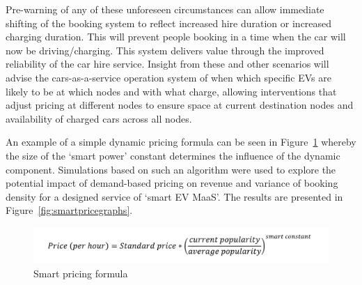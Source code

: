 \documentclass[b5paper,10pt]{article}
\begin{document}
Pre-warning of any of these unforeseen circumstances can allow
immediate shifting of the booking system to reflect increased hire
duration or increased charging duration. This will prevent people
booking in a time when the car will now be driving/charging. This
system delivers value through the improved reliability of the car hire
service. Insight from these and other scenarios will advise the
cars-as-a-service operation system of when which specific EVs are
likely to be at which nodes and with what charge, allowing
interventions that adjust pricing at different nodes to ensure space
at current destination nodes and availability of charged cars across
all nodes.

An example of a simple dynamic pricing formula can be seen in
Figure~\ref{fig:smartpricingformula} whereby the size of the `smart
power' constant determines the influence of the dynamic component.
Simulations based on such an algorithm were used to explore the
potential impact of demand-based pricing on revenue and variance of
booking density for a designed service of `smart EV MaaS'. The results
are presented in Figure~\ref{fig:smartpricegraphs}.


\begin{figure}[!ht]
\centering
\includegraphics[width=0.75\columnwidth]{images/smartpricingformula.png}
\caption{Smart pricing formula}
\label{fig:smartpricingformula}
\end{figure}

\end{document}

